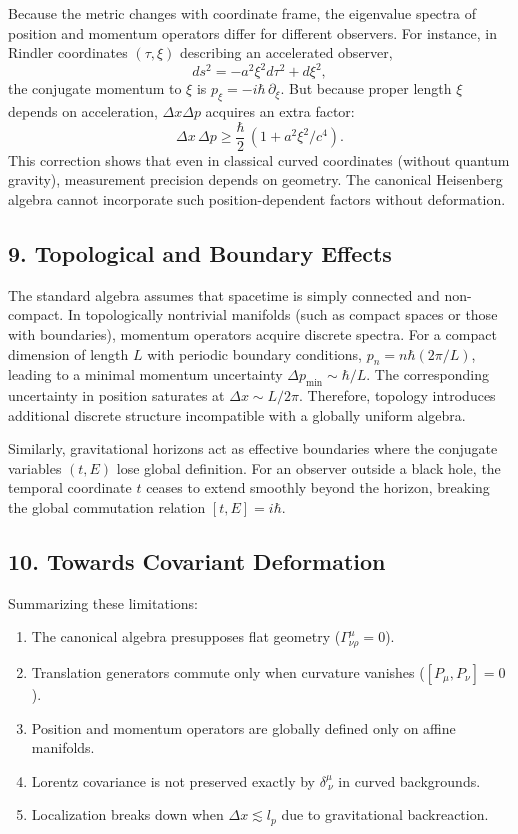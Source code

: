 \documentclass[11pt,oneside]{book}
\numberwithin{equation}{chapter}
\begin{document}
Because the metric changes with coordinate frame, the eigenvalue spectra of position and momentum operators differ for different observers.  
For instance, in Rindler coordinates $(\tau,\xi)$ describing an accelerated observer,
\begin{equation}
ds^2 = -a^2\xi^2 d\tau^2 + d\xi^2,
\end{equation}
the conjugate momentum to $\xi$ is $p_\xi = -i\hbar\,\partial_\xi$.  
But because proper length $\xi$ depends on acceleration, $\Delta x \Delta p$ acquires an extra factor:
\begin{equation}
\Delta x\,\Delta p \ge \frac{\hbar}{2}\,(1+a^2\xi^2/c^4).
\end{equation}
This correction shows that even in classical curved coordinates (without quantum gravity), measurement precision depends on geometry.  
The canonical Heisenberg algebra cannot incorporate such position-dependent factors without deformation.

\subsection*{9. Topological and Boundary Effects}

The standard algebra assumes that spacetime is simply connected and non-compact.  
In topologically nontrivial manifolds (such as compact spaces or those with boundaries), momentum operators acquire discrete spectra.  
For a compact dimension of length $L$ with periodic boundary conditions, $p_n = n\hbar(2\pi/L)$, leading to a minimal momentum uncertainty $\Delta p_{\min}\sim\hbar/L$.  
The corresponding uncertainty in position saturates at $\Delta x\sim L/2\pi$.  
Therefore, topology introduces additional discrete structure incompatible with a globally uniform algebra.

Similarly, gravitational horizons act as effective boundaries where the conjugate variables $(t,E)$ lose global definition.  
For an observer outside a black hole, the temporal coordinate $t$ ceases to extend smoothly beyond the horizon, breaking the global commutation relation $[t,E]=i\hbar$.

\subsection*{10. Towards Covariant Deformation}

Summarizing these limitations:

\begin{enumerate}
\item The canonical algebra presupposes flat geometry ($\Gamma^\mu_{\nu\rho}=0$).  
\item Translation generators commute only when curvature vanishes ($[P_\mu,P_\nu]=0$).  
\item Position and momentum operators are globally defined only on affine manifolds.  
\item Lorentz covariance is not preserved exactly by $\delta^\mu_{\ \nu}$ in curved backgrounds.  
\item Localization breaks down when $\Delta x \lesssim l_p$ due to gravitational backreaction.
\end{enumerate}
\end{document}

